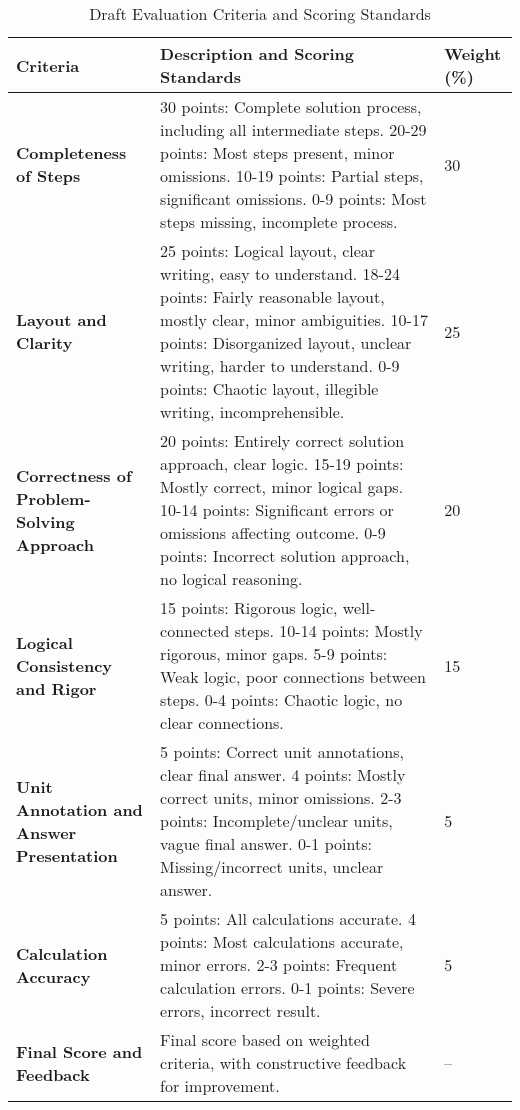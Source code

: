 \begin{table}[htbp]
\centering
\renewcommand{\arraystretch}{1.5} %
\caption{Draft Evaluation Criteria and Scoring Standards}\label{tab:draft_cri}
\label{tab:grading-criteria}
\begin{tabularx}{\textwidth}{|p{}|X|p{}|}
\hline
\textbf{Criteria} & \textbf{Description and Scoring Standards} & \textbf{Weight (\%)} \\ \hline

\textbf{Completeness of Steps} & 
30 points: Complete solution process, including all intermediate steps.  
20-29 points: Most steps present, minor omissions.  
10-19 points: Partial steps, significant omissions.  
0-9 points: Most steps missing, incomplete process. 
& 30 \\ \hline

\textbf{Layout and Clarity} & 
25 points: Logical layout, clear writing, easy to understand.  
18-24 points: Fairly reasonable layout, mostly clear, minor ambiguities.  
10-17 points: Disorganized layout, unclear writing, harder to understand.  
0-9 points: Chaotic layout, illegible writing, incomprehensible.  
& 25 \\ \hline

\textbf{Correctness of Problem-Solving Approach} & 
20 points: Entirely correct solution approach, clear logic.  
15-19 points: Mostly correct, minor logical gaps.  
10-14 points: Significant errors or omissions affecting outcome.  
0-9 points: Incorrect solution approach, no logical reasoning.  
& 20 \\ \hline

\textbf{Logical Consistency and Rigor} & 
15 points: Rigorous logic, well-connected steps.  
10-14 points: Mostly rigorous, minor gaps.  
5-9 points: Weak logic, poor connections between steps.  
0-4 points: Chaotic logic, no clear connections.  
& 15 \\ \hline

\textbf{Unit Annotation and Answer Presentation} & 
5 points: Correct unit annotations, clear final answer.  
4 points: Mostly correct units, minor omissions.  
2-3 points: Incomplete/unclear units, vague final answer.  
0-1 points: Missing/incorrect units, unclear answer.  
& 5 \\ \hline

\textbf{Calculation Accuracy} & 
5 points: All calculations accurate.  
4 points: Most calculations accurate, minor errors.  
2-3 points: Frequent calculation errors.  
0-1 points: Severe errors, incorrect result.  
& 5 \\ \hline

\textbf{Final Score and Feedback} & 
Final score based on weighted criteria, with constructive feedback for improvement. 
& -- \\ \hline

\end{tabularx}
\end{table}


